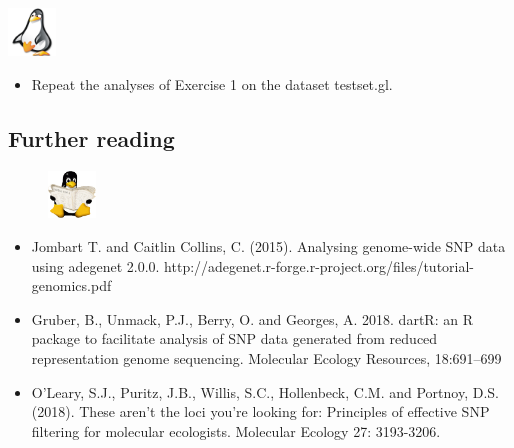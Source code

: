 \documentclass[
  letterpaper,
  DIV=11,
  numbers=noendperiod]{scrreprt}
\providecommand{\tightlist}{%
  \setlength{\itemsep}{0pt}\setlength{\parskip}{0pt}}\usepackage{longtable,booktabs,array}
\begin{document}
\begin{tcolorbox}[enhanced jigsaw, toptitle=1mm, colframe=quarto-callout-note-color-frame, title=\textcolor{quarto-callout-note-color}{\faInfo}\hspace{0.5em}{Exercise 2: Filtering the Turtle dataset}, breakable, arc=.35mm, bottomrule=.15mm, bottomtitle=1mm, opacitybacktitle=0.6, titlerule=0mm, rightrule=.15mm, toprule=.15mm, leftrule=.75mm, coltitle=black, left=2mm, opacityback=0, colback=white, colbacktitle=quarto-callout-note-color!10!white]

\includegraphics[width=0.5in,height=0.5in]{images/task.png}

\begin{itemize}
\tightlist
\item
  Repeat the analyses of Exercise 1 on the dataset testset.gl.
\end{itemize}

\end{tcolorbox}

\hypertarget{further-reading}{%
\subsection{Further reading}\label{further-reading}}

\begin{figure}

\hfill{} \includegraphics[width=0.5in,height=0.5in]{images/reading.png}

\end{figure}

\begin{itemize}
\item
  Jombart T. and Caitlin Collins, C. (2015). Analysing genome-wide SNP
  data using adegenet 2.0.0.
  http://adegenet.r-forge.r-project.org/files/tutorial-genomics.pdf
\item
  Gruber, B., Unmack, P.J., Berry, O. and Georges, A. 2018. dartR: an R
  package to facilitate analysis of SNP data generated from reduced
  representation genome sequencing. Molecular Ecology Resources,
  18:691--699
\item
  O'Leary, S.J., Puritz, J.B., Willis, S.C., Hollenbeck, C.M. and
  Portnoy, D.S. (2018). These aren't the loci you're looking for:
  Principles of effective SNP filtering for molecular ecologists.
  Molecular Ecology 27: 3193-3206.
\end{itemize}
\end{document}
